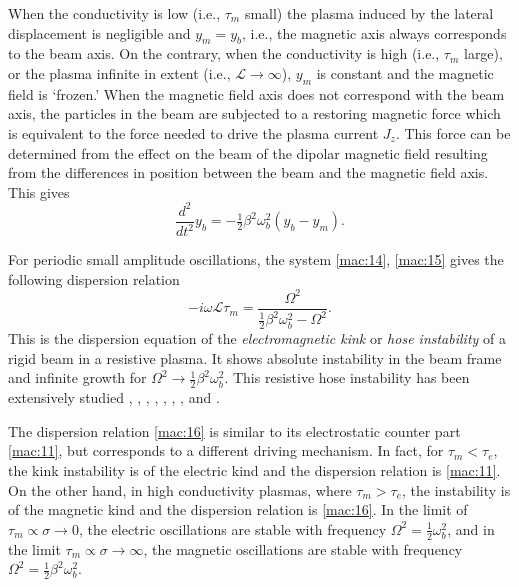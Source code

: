 \documentclass [12pt,a4paper,     ]{report} %
\newcommand{\Oh}{\tfrac{1}{2}}        %
\begin{document}
   When the conductivity is low (i.e., $\tau_m$ small) the plasma induced by the lateral displacement is negligible and $y_m = y_b$, i.e., the magnetic axis always corresponds to the beam axis.  On the contrary, when the conductivity is high (i.e., $\tau_m$ large), or the plasma infinite in extent (i.e.,  $\mathcal{L} \rightarrow \infty$), $y_m$ is constant and the magnetic field is `frozen.'  When the magnetic field axis does not correspond with the beam axis, the particles in the beam are subjected to a restoring magnetic force which is equivalent to the force needed to drive the plasma current $J_z$.  This force can be determined from the effect on the beam of the dipolar magnetic field resulting from the differences in position between the beam and the magnetic field axis.  This gives
%
\begin{equation}\label{mac:15} %
          \frac{d^2}{dt^2} y_b = -\Oh \beta^2 \omega_b^2 (y_b - y_m).
\end{equation}
%

  For periodic small amplitude oscillations, the system \eqref{mac:14}, \eqref{mac:15} gives the following dispersion relation \cite{LEE--1973B,LEE--1978-}
%
\begin{equation}\label{mac:16} %
 -i\omega\mathcal{L}\tau_m = \frac{\Omega^2}{\Oh\beta^2\omega_b^2- \Omega^2}.
\end{equation}
%
This is the dispersion equation of the \emph{electromagnetic kink} or \emph{hose instability} of a rigid beam in a resistive plasma.  It shows absolute instability in the beam frame and infinite growth for $\Omega^2 \rightarrow \Oh\beta^2\omega_b^2$.  This resistive hose instability has been extensively studied \cite{IVANO1970-}, \cite{UHM--1981-}, \cite{WEINB1967-}, \cite{ROSEN1960-}, \cite{LEE--1973B}, \cite{LEE--1975-}, \cite{LEE--1978-}, \cite{UHM--1980-} and \cite{LAMPE1981-}.


	The dispersion relation \eqref{mac:16} is similar to its electrostatic counter part \eqref{mac:11}, but corresponds to a different driving mechanism.  In fact, for $\tau_m<\tau_e$, the kink instability is of the electric kind and the dispersion relation is \eqref{mac:11}.  On the other hand, in high conductivity plasmas, where $\tau_m>\tau_e$, the instability is of the magnetic kind and the dispersion relation is \eqref{mac:16}.  In the limit of $\tau_m \propto \sigma \rightarrow 0$, the electric oscillations are stable with frequency $\Omega^2 =\Oh\omega_b^2$, and in the limit $\tau_m \propto \sigma \rightarrow \infty$, the magnetic oscillations are stable with frequency $\Omega^2 =\Oh\beta^2\omega_b^2$. 
\end{document}
